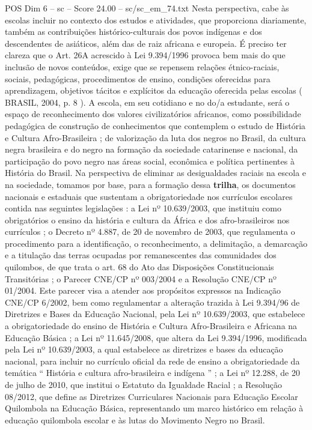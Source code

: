 \begin{textsample}{POS Dim 6 – sc – Score 24.00 – sc/sc\_em\_74.txt}
Nesta perspectiva, cabe às escolas incluir no contexto dos estudos e atividades, que proporciona diariamente, também as contribuições histórico-culturais dos povos indígenas e dos descendentes de asiáticos, além das de raiz africana e europeia.
É preciso ter clareza que o Art. 26A acrescido à Lei 9.394/1996 provoca bem mais do que inclusão de novos conteúdos, exige que se repensem relações étnico-raciais, sociais, pedagógicas, procedimentos de ensino, condições oferecidas para aprendizagem, objetivos tácitos e explícitos da educação oferecida pelas escolas ( BRASIL, 2004, p. 8 ).
A escola, em seu cotidiano e no do/a estudante, será o espaço de reconhecimento dos valores civilizatórios africanos, como possibilidade pedagógica de construção de conhecimentos que contemplem o estudo de História e Cultura Afro-Brasileira ; de valorização da luta dos negros no Brasil, da cultura negra brasileira e do negro na formação da sociedade catarinense e nacional, da participação do povo negro nas áreas social, econômica e política pertinentes à História do Brasil.
Na perspectiva de eliminar as desigualdades raciais na escola e na sociedade, tomamos por base, para a formação dessa \textbf{trilha}, os documentos nacionais e estaduais que sustentam a obrigatoriedade nos currículos escolares contida nas seguintes legislações : a Lei nº 10.639/2003, que instituiu como obrigatórios o ensino da história e cultura da África e dos afro-brasileiros nos currículos ; o Decreto nº 4.887, de 20 de novembro de 2003, que regulamenta o procedimento para a identificação, o reconhecimento, a delimitação, a demarcação e a titulação das terras ocupadas por remanescentes das comunidades dos quilombos, de que trata o art. 68 do Ato das Disposições Constitucionais Transitórias ; o Parecer CNE/CP nº 003/2004 e a Resolução CNE/CP nº 01/2004.
Este parecer visa a atender aos propósitos expressos na Indicação CNE/CP 6/2002, bem como regulamentar a alteração trazida à Lei 9.394/96 de Diretrizes e Bases da Educação Nacional, pela Lei nº 10.639/2003, que estabelece a obrigatoriedade do ensino de História e Cultura Afro-Brasileira e Africana na Educação Básica ; a Lei nº 11.645/2008, que altera da Lei 9.394/1996, modificada pela Lei nº 10.639/2003, a qual estabelece as diretrizes e bases da educação nacional, para incluir no currículo oficial da rede de ensino a obrigatoriedade da temática “ História e cultura afro-brasileira e indígena ” ; a Lei nº 12.288, de 20 de julho de 2010, que institui o Estatuto da Igualdade Racial ; a Resolução 08/2012, que define as Diretrizes Curriculares Nacionais para Educação Escolar Quilombola na Educação Básica, representando um marco histórico em relação à educação quilombola escolar e às lutas do Movimento Negro no Brasil.

\end{textsample}
